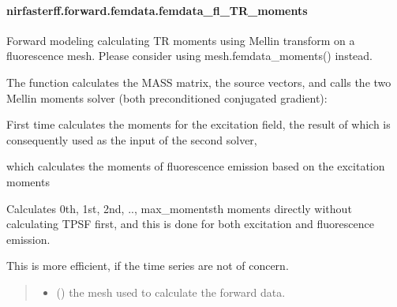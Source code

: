 \documentclass[letterpaper,10pt,english]{sphinxmanual}
\begin{document}
\sphinxstepscope


\paragraph{nirfasterff.forward.femdata.femdata\_fl\_TR\_moments}
\label{\detokenize{_autosummary/nirfasterff.forward.femdata.femdata_fl_TR_moments:nirfasterff-forward-femdata-femdata-fl-tr-moments}}\label{\detokenize{_autosummary/nirfasterff.forward.femdata.femdata_fl_TR_moments::doc}}

\begin{fulllineitems}
\label{\detokenize{_autosummary/nirfasterff.forward.femdata.femdata_fl_TR_moments:nirfasterff.forward.femdata.femdata_fl_TR_moments}}
\pysigstartsignatures
\pysiglinewithargsret
{}
{\sphinxparamcomma {}\sphinxparamcomma {}\sphinxparamcomma {}\sphinxparamcomma {}}
{}
\pysigstopsignatures
\sphinxAtStartPar
Forward modeling calculating TR moments using Mellin transform on a fluorescence mesh. Please consider using mesh.femdata\_moments() instead.

\sphinxAtStartPar
The function calculates the MASS matrix, the source vectors, and calls the two Mellin moments solver (both preconditioned conjugated gradient):

\sphinxAtStartPar
First time calculates the moments for the excitation field, the result of which is consequently used as the input of the second solver,

\sphinxAtStartPar
which calculates the moments of fluorescence emission based on the excitation moments

\sphinxAtStartPar
Calculates 0th, 1st, 2nd, .., max\_moments\sphinxhyphen{}th moments directly without calculating TPSF first, and this is done for both excitation and fluorescence emission.

\sphinxAtStartPar
This is more efficient, if the time series are not of concern.
\begin{quote}\begin{description}
\begin{itemize}
\item {} 
\sphinxAtStartPar
{} () \textendash{} the mesh used to calculate the forward data.


\end{itemize}
\end{description}
\end{quote}
\end{fulllineitems}
\end{document}
